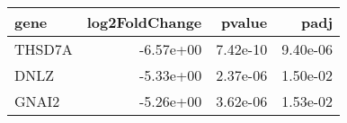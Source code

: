 \begin{tabular}{lrrr}
\toprule
  gene &  log2FoldChange &   pvalue &     padj \\
\midrule
THSD7A &       -6.57e+00 & 7.42e-10 & 9.40e-06 \\
  DNLZ &       -5.33e+00 & 2.37e-06 & 1.50e-02 \\
 GNAI2 &       -5.26e+00 & 3.62e-06 & 1.53e-02 \\
\bottomrule
\end{tabular}
